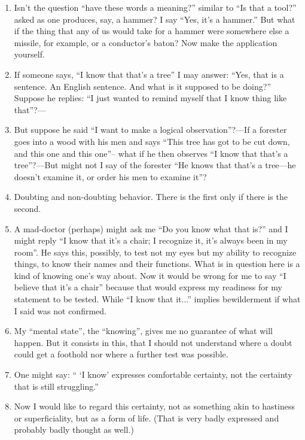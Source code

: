\documentclass{book}
\begin{document}
\begin{enumerate}
\item
Isn't the question ``have these words a meaning?'' similar to ``Is that a
tool?'' asked as one produces, say, a hammer? I say ``Yes, it's a hammer.'' But
what if the thing that any of us would take for a hammer were somewhere else a
missile, for example, or a conductor's baton? Now make the application
yourself.

\item
If someone says, ``I know that that's a tree'' I may answer: ``Yes, that is a
sentence. An English sentence. And what is it supposed to be doing?'' Suppose
he replies: ``I just wanted to remind myself that I know thing like that''?---

\item
But suppose he said ``I want to make a logical observation''?---If a forester
goes into a wood with his men and says ``This tree has got to be cut down, and
this one and this one''-- what if he then observes ``I know that that's a
tree''?---But might not I say of the forester ``He knows that that's a
tree---he doesn't examine it, or order his men to examine it''?

\item
Doubting and non-doubting behavior. There is the first only if there is the
second.

\item
A mad-doctor (perhaps) might ask me ``Do you know what that is?'' and I might
reply ``I know that it's a chair; I recognize it, it's always been in my
room''. He says this, possibly, to test not my eyes but my ability to recognize
things, to know their names and their functions. What is in question here is a
kind of knowing one's way about. Now it would be wrong for me to say ``I
believe that it's a chair'' because that would express my readiness for my
statement to be tested. While ``I know that it...'' implies bewilderment if
what I said was not confirmed.

\item
My ``mental state'', the ``knowing'', gives me no guarantee of what will
happen. But it consists in this, that I should not understand where a doubt
could get a foothold nor where a further test was possible.

\item
One might say: `` `I know' expresses comfortable certainty, not the certainty
that is still struggling.''

\item
Now I would like to regard this certainty, not as something akin to hastiness
or superficiality, but as a form of life. (That is very badly expressed and
probably badly thought as well.)


\end{enumerate}
\end{document}
